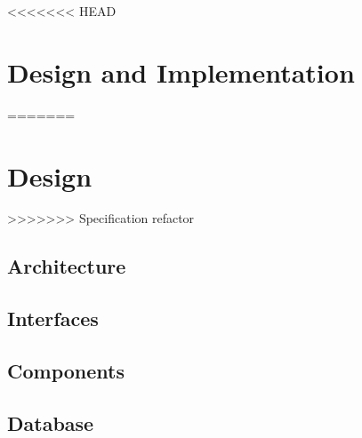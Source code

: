 <<<<<<< HEAD
\chapter{Design and Implementation}\label{part:design}
=======
\chapter{Design}\label{part:design}
>>>>>>> Specification refactor





\section{Architecture}
 
\section{Interfaces}
 
\section{Components}
 
\section{Database}
 


